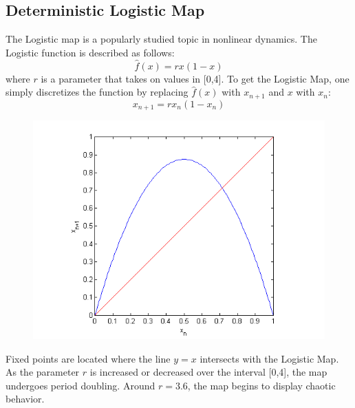 \documentclass[12pt]{article}
\begin{document}
\subsection{Deterministic Logistic Map}
The Logistic map is a popularly studied topic in nonlinear
dynamics. The Logistic function is described as follows:
\begin{equation}\label{orig}
\hat{f}(x) = rx(1-x)
\end{equation}
where $r$ is a parameter that takes on values in [0,4]. To get the
Logistic Map, one simply discretizes the function by replacing
$\hat{f}(x)$ with $x_{n+1}$ and $x$ with $x_n$:
\begin{equation*}
x_{n+1}=rx_n(1-x_n)
\end{equation*}
\begin{figure}[H]
	\begin{center}
		\includegraphics[scale=0.7]{deterministic}
	\end{center}
\end{figure}
Fixed points are located where the line $y=x$ intersects with the
Logistic Map. As the parameter $r$ is increased or decreased over the
interval [0,4], the map undergoes period doubling. Around $r=3.6$, the
map begins to display chaotic behavior.
\end{document}
